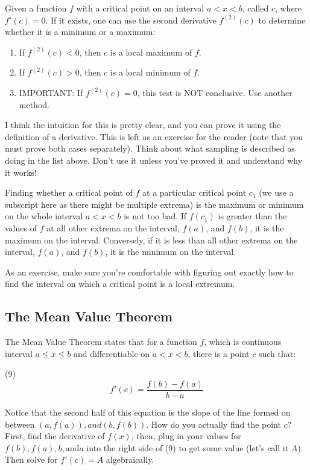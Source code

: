\documentclass[12pt]{amsart}
\begin{document}
Given a function $f$ with a critical point on an interval $a < x < b$, called $c$, where $f'(c) = 0$. If it exists, one can use the second derivative $f^{(2)}(c)$ to determine whether it is a minimum or a maximum:

\begin{enumerate}
\item If $f^{(2)}(c) < 0$, then $c$ is a local maximum of $f$.
\item If $f^{(2)}(c) > 0$, then $c$ is a local minimum of $f$.
\item IMPORTANT: If $f^{(2)}(c) = 0$, this test is NOT conclusive. Use another method.
\end{enumerate}


I think the intuition for this is pretty clear, and you can prove it using the definition of a derivative. This is left as an exercise for the reader (note that you must prove both cases separately). Think about what sampling is described as doing in the list above. Don't use it unless you've proved it and understand why it works!

Finding whether a critical point of $f$ at a particular critical point $c_1$ (we use a subscript here as there might be multiple extrema) is the maximum or minimum on the whole interval $a < x < b$ is not too bad. If $f(c_1)$ is greater than the values of $f$ at all other extrema on the interval, $f(a)$, and $f(b)$, it is the maximum on the interval. Conversely, if it is less than all other extrema on the interval, $f(a)$, and $f(b)$, it is the minimum on the interval. 

As an exercise, make sure you're comfortable with figuring out exactly how to find the interval on which a critical point is a local extremum. 

\subsection{The Mean Value Theorem}

The Mean Value Theorem states that for a function $f$, which is continuous interval $a \leq x \leq b$ and differentiable on $a < x < b$, there is a point $c$ such that:

(9) $$f'(c) = \frac{f(b) - f(a)}{b - a}$$

Notice that the second half of this equation is the slope of the line formed on between $(a, f(a)), and (b, f(b))$. How do you actually find the point $c$? First, find the derivative of $f(x)$, then, plug in your values for $f(b), f(a), b, \text{and} a$ into the right side of (9) to get some value (let's call it $A$). Then solve for $f'(c) = A$ algebraically.
\end{document}
